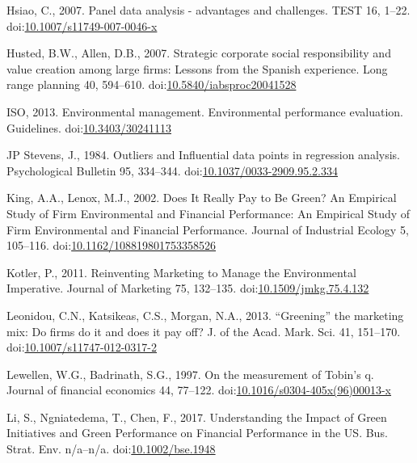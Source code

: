 \documentclass[12pt,]{article}
\begin{document}
\hypertarget{ref-Hsiao2007}{}
Hsiao, C., 2007. Panel data analysis - advantages and challenges. TEST
16, 1--22.
doi:\href{https://doi.org/10.1007/s11749-007-0046-x}{10.1007/s11749-007-0046-x}

\hypertarget{ref-Husted2007}{}
Husted, B.W., Allen, D.B., 2007. Strategic corporate social
responsibility and value creation among large firms: Lessons from the
Spanish experience. Long range planning 40, 594--610.
doi:\href{https://doi.org/10.5840/iabsproc20041528}{10.5840/iabsproc20041528}

\hypertarget{ref-ISO2013}{}
ISO, 2013. Environmental management. Environmental performance
evaluation. Guidelines.
doi:\href{https://doi.org/10.3403/30241113}{10.3403/30241113}

\hypertarget{ref-JPStevens1984}{}
JP Stevens, J., 1984. Outliers and Influential data points in regression
analysis. Psychological Bulletin 95, 334--344.
doi:\href{https://doi.org/10.1037/0033-2909.95.2.334}{10.1037/0033-2909.95.2.334}

\hypertarget{ref-King2002}{}
King, A.A., Lenox, M.J., 2002. Does It Really Pay to Be Green? An
Empirical Study of Firm Environmental and Financial Performance: An
Empirical Study of Firm Environmental and Financial Performance. Journal
of Industrial Ecology 5, 105--116.
doi:\href{https://doi.org/10.1162/108819801753358526}{10.1162/108819801753358526}

\hypertarget{ref-Kotler2011}{}
Kotler, P., 2011. Reinventing Marketing to Manage the Environmental
Imperative. Journal of Marketing 75, 132--135.
doi:\href{https://doi.org/10.1509/jmkg.75.4.132}{10.1509/jmkg.75.4.132}

\hypertarget{ref-Leonidou2013}{}
Leonidou, C.N., Katsikeas, C.S., Morgan, N.A., 2013. ``Greening'' the
marketing mix: Do firms do it and does it pay off? J. of the Acad. Mark.
Sci. 41, 151--170.
doi:\href{https://doi.org/10.1007/s11747-012-0317-2}{10.1007/s11747-012-0317-2}

\hypertarget{ref-Lewellen1997}{}
Lewellen, W.G., Badrinath, S.G., 1997. On the measurement of Tobin's q.
Journal of financial economics 44, 77--122.
doi:\href{https://doi.org/10.1016/s0304-405x(96)00013-x}{10.1016/s0304-405x(96)00013-x}

\hypertarget{ref-Li2017}{}
Li, S., Ngniatedema, T., Chen, F., 2017. Understanding the Impact of
Green Initiatives and Green Performance on Financial Performance in the
US. Bus. Strat. Env. n/a--n/a.
doi:\href{https://doi.org/10.1002/bse.1948}{10.1002/bse.1948}
\end{document}
